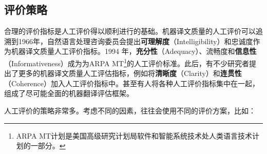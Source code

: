 
\subsection{评价策略}

\parinterval 合理的评价指标是人工评价得以顺利进行的基础。机器译文质量的人工评价可以追溯到1966年，自然语言处理咨询委员会提出{\small\sffamily\bfseries{可理解度}}（Intelligibility）和忠诚度作为机器译文质量人工评价指标。1994 年，{\small\sffamily\bfseries{充分性}}（Adequacy）、流畅度和{\small\sffamily\bfseries{信息性}}（Informativeness）成为为ARPA MT\footnote{ARPA MT计划是美国高级研究计划局软件和智能系统技术处人类语言技术计划的一部分。}的人工评价标准。此后，有不少研究者提出了更多的机器译文质量人工评估指标，例如将{\small\sffamily\bfseries{清晰度}}（Clarity）和{\small\sffamily\bfseries{连贯性}}（Coherence）加入人工评价指标中。甚至有人将各种人工评价指标集中在一起，组成了尽可能全面的机器翻译评估框架。

\parinterval 人工评价的策略非常多。考虑不同的因素，往往会使用不同的评价方案，比如：


